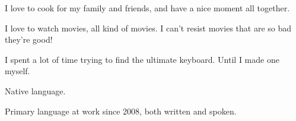 \begin{rubric}{
}
\entry*[Cooking] I love to cook for my family and friends, and have a nice moment all together.


\entry*[Movies] I love to watch movies, all kind of movies. I can't resist movies that are so bad they're good!

 I spent a lot of time trying to find the ultimate keyboard. Until I made one myself.


\entry*[French] Native language.

\entry*[English] Primary language at work since 2008, both written and spoken.

\end{rubric}


